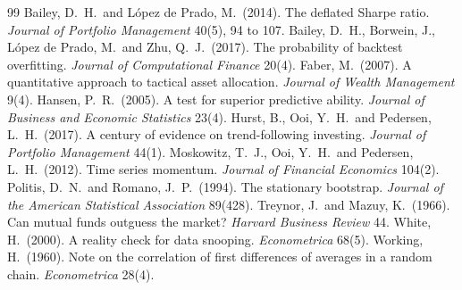 \documentclass[11pt]{article}
\begin{document}
\small\begin{thebibliography}{99}
 Bailey, D.\ H.\ and L\'opez de Prado, M.\ (2014). The deflated Sharpe ratio. \emph{Journal of Portfolio Management} 40(5), 94 to 107.
 Bailey, D.\ H., Borwein, J., L\'opez de Prado, M.\ and Zhu, Q.\ J.\ (2017). The probability of backtest overfitting. \emph{Journal of Computational Finance} 20(4).
 Faber, M.\ (2007). A quantitative approach to tactical asset allocation. \emph{Journal of Wealth Management} 9(4).
 Hansen, P.\ R.\ (2005). A test for superior predictive ability. \emph{Journal of Business and Economic Statistics} 23(4).
 Hurst, B., Ooi, Y.\ H.\ and Pedersen, L.\ H.\ (2017). A century of evidence on trend-following investing. \emph{Journal of Portfolio Management} 44(1).
 Moskowitz, T.\ J., Ooi, Y.\ H.\ and Pedersen, L.\ H.\ (2012). Time series momentum. \emph{Journal of Financial Economics} 104(2).
 Politis, D.\ N.\ and Romano, J.\ P.\ (1994). The stationary bootstrap. \emph{Journal of the American Statistical Association} 89(428).
 Treynor, J.\ and Mazuy, K.\ (1966). Can mutual funds outguess the market? \emph{Harvard Business Review} 44.
 White, H.\ (2000). A reality check for data snooping. \emph{Econometrica} 68(5).
 Working, H.\ (1960). Note on the correlation of first differences of averages in a random chain. \emph{Econometrica} 28(4).
\end{thebibliography}
\end{document}

